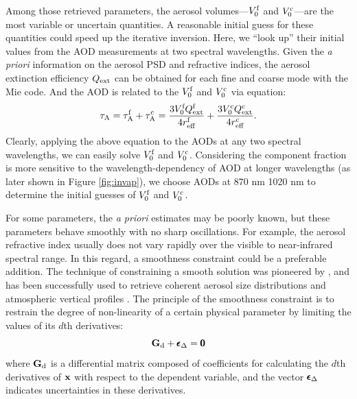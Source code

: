 Among those retrieved parameters, the aerosol volumes---$V_0^\text{f}$ and
$V_0^\text{c}$---are the most variable or uncertain quantities. A reasonable
initial guess for these quantities could speed up the iterative
inversion. Here, we “look up” their initial values from the AOD
measurements at two spectral wavelengths. Given the \textit{a priori}
 information on the aerosol PSD and refractive indices, the aerosol 
extinction efficiency $Q_\text{ext}$ can be obtained for each fine and coarse 
mode with the Mie code. And the AOD is related to the $V_0^\text{f}$ and
$V_0^\text{c}$ via equation:
\begin{equation}
\tau_\text{A} = \tau_\text{A}^\text{f} + \tau_\text{A}^\text{c} 
      = \frac{3V_0^\text{f}Q_\text{ext}^\text{f}}{4r_\text{eff}^\text{f}} +
        \frac{3V_0^\text{c}Q_\text{ext}^\text{c}}{4r_\text{eff}^\text{c}}. 
\end{equation}
Clearly, applying the above equation to the AODs at any two spectral
wavelengths, we can easily solve $V_0^\text{f}$ and $V_0^\text{c}$.
Considering the component fraction is more sensitive to the
wavelength-dependency of AOD at longer wavelengths (as later shown in Figure
\ref{fig:invap}), we choose AODs at 870 nm 1020 nm to determine the initial
guesses of $V_0^\text{f}$ and $V_0^\text{c}$.

For some parameters, the \textit{a priori} estimates may be poorly known, 
but these parameters behave smoothly with no sharp oscillations. For
example, the aerosol refractive index usually does not vary rapidly over
the visible to near-infrared spectral range. In this regard, a
smoothness constraint could be a preferable addition. The technique of
constraining a smooth solution was pioneered by \citet{Phillips62,
Twomey63}, and has been successfully used to retrieve coherent
aerosol size distributions \citep{Dubovik00a} and atmospheric
vertical profiles \citep{Twomey77}. The principle of the smoothness
constraint is to restrain the degree of non-linearity of a certain
physical parameter by limiting the values of its $d$th derivatives:
\begin{equation}
\mathbf{G}_\text{d}+\pmb{\epsilon}_\Delta=\pmb{0} \label{eq:smooth}
\end{equation}
where $\mathbf{G}_\text{d}$ is a differential matrix composed of coefficients for
calculating the $d$th derivatives of $\mathbf{x}$ with respect to the dependent
variable, and the vector $\pmb{\epsilon}_\Delta$ indicates uncertainties in these
derivatives. 

